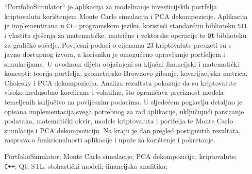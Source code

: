 \documentclass[zavrsnirad, upload]{fer}
\begin{document}




\begin{sazetak}
    ``PortfolioSimulator`` je aplikacija za modeliranje investicijskih
    portfelja kriptovaluta korištenjem Monte Carlo simulacija i PCA
    dekompozicije. Aplikacija je implementirana u \texttt{C++} programskom jeziku,
    koristeći standardnu biblioteku \texttt{STL} i vlastita rješenja za
    matematičke, matrične i vektorske operacije te \texttt{Qt} biblioteku
    za grafičko sučelje.
    Povijesni podaci o cijenama 23 kriptovalute preuzeti su s
    javno dostupnog izvora, a korisniku je omogućeno upravljanje
    portfeljem i simulacijama.
    U uvodnom dijelu objašnjeni su ključni financijski i matematički
    koncepti: teorija portfelja, geometrijsko Brownovo gibanje,
    kovarijacijska matrica, Cholesky i PCA dekompozicija.
    Analiza rezultata pokazuje da su kriptovalute visoko međusobno
    korelirane i volatilne, što ograničava preciznost modela
    temeljenih isključivo na povijesnim podacima.
    U sljedećem poglavlju detaljno je opisana implementacija svega
    potrebnog za rad aplikacije, uključujući parsiranje podataka,
    matematički okvir, modele kriptovaluta i portfelja te Monte Carlo
    simulacije i PCA dekompoziciju. Na kraju je dan pregled postignutih
    rezultata, rasprava o funkcionalnosti aplikacije i upute za korištenje
    i pokretanje.
\end{sazetak}

\begin{kljucnerijeci}
    PortfolioSimulator; Monte Carlo simulacije; PCA dekompozicija;
    kriptovalute; \texttt{C++}; Qt; STL; stohastički modeli; financijska analitika;
\end{kljucnerijeci}
\end{document}
